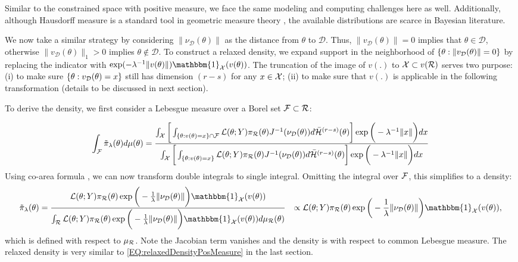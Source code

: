 \documentclass[10pt,fleqn]{article}
\DeclareMathOperator{\1}{\mathbbm{1}} \DeclareMathOperator{\bigO}{\mc O}
\begin{document}
Similar to the constrained space with positive measure, we face the
same modeling and computing challenges here as well.  Additionally,
although Hausdorff measure is a standard tool in geometric measure theory
\citep{federer2014geometric}, the available distributions are scarce in
Bayesian literature.

We now take a similar strategy by considering $\|\nu_\mathcal{D}(\theta)\|$ as
the distance from $\theta$ to $\mathcal{D}.$ Thus, $\|v_\mathcal{D}(\theta)\| =
0$ implies that $\theta \in \mathcal{D}$, otherwise
$\|v_\mathcal{D}(\theta)\|_1 >0$ implies $\theta\notin\mathcal{D}.$
To construct a relaxed density, we expand support in the neighborhood of
$\{\theta:\|v_{\mathcal{D}}(\theta)\|=0\}$ by replacing the indicator with $\exp(
-{\lambda^{-1}}\|v(\theta)\|) \mathbbm{1}_{\mc X}(v(\theta))$. The truncation
of the image of $v(.)$ to $\mathcal{X}\subset v(\mathcal{R})$ serves two purpose: (i)
to make sure $\{\theta:v_{\mathcal{D}}(\theta)=x\}$ still has dimension $(r-s)$
for any $x\in \mathcal{X}$; (ii) to make sure that $v(.)$ is applicable in the
following transformation (details to be discussed in next section).

To derive the density, we first
consider a Lebesgue measure over a Borel set $\mathcal{F} \subset \mathcal{R}$:

$$\int_{\mathcal{F}} \tilde{\pi}_\lambda(\theta) d \mu(\theta)= \frac{\int_{\mathcal{X}}
\bigg[ \int_{ \{\theta:v(\theta)=x\}\cap \mathcal{F} }
{\mathcal{L}(\theta;Y)\pi_\mathcal{R}(\theta)}{J^{-1}(\nu_\mathcal{D}(\theta))}
d\bar{\mathcal{H}}^{(r-s)}(\theta) \bigg] \exp\bigg(-{\lambda^{-1}}\|x\|\bigg
)dx
}
{\int_{\mathcal{X}} \bigg[ \int_{\{\theta:v(\theta)=x\}}
{\mathcal{L}(\theta;Y)\pi_\mathcal{R}(\theta)}{J^{-1}(\nu_\mathcal{D}(\theta))}
d\bar{\mathcal{H}}^{(r-s)}(\theta) \bigg] \exp\bigg(-{\lambda^{-1}}\|x\|\bigg
)dx }$$
Using co-area formula \citep{federer2014geometric}, we can now
transform double integrals to single integral. Omitting the integral over
$\mathcal{F}$, this simplifies to a density:
\begin{equation}
\begin{split}
\label{EQ:relaxedDensityZeroMeasure}
\tilde{\pi}_\lambda(\theta) &=
\dfrac{\mathcal{L}(\theta;Y)
\pi_\mathcal{R}(\theta)\exp\bigg(-\frac{1}{\lambda}\|\nu_\mathcal{D}(\theta)\|\bigg)
\mathbbm{1}_{\mc X}(v(\theta))
}{\int_\mathcal{R} \mathcal{L}(\theta;Y)
\pi_\mathcal{R}(\theta)\exp\bigg(-\frac{1}{\lambda}\|\nu_\mathcal{D}(\theta)\|\bigg)
\mathbbm{1}_{\mc X}(v(\theta)) d\mu_\mathcal{R}(\theta)
} & \propto \mathcal{L}(\theta;Y)
\pi_\mathcal{R}(\theta)\exp\bigg(-\frac{1}{\lambda}\|\nu_\mathcal{D}(\theta)\|\bigg)
\mathbbm{1}_{\mc X}(v(\theta)),
\end{split}
\end{equation}
which is defined with respect to $\mu_{\mathcal{R}}$. Note the Jacobian term
vanishes and the density is with respect to common Lebesgue measure.
The relaxed density is very similar to \eqref{EQ:relaxedDensityPosMeasure}
in the last section.
\end{document}
